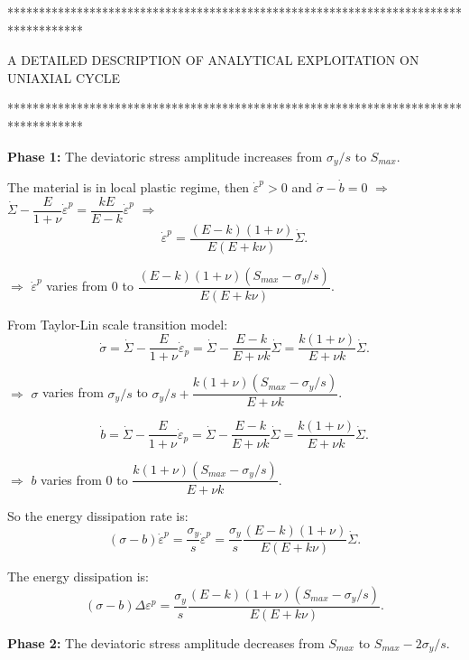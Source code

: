 ************************************************************************************

 A DETAILED DESCRIPTION OF ANALYTICAL EXPLOITATION ON UNIAXIAL CYCLE
 
\noindent              
************************************************************************************

\noindent
\textbf{Phase 1:} The deviatoric stress amplitude increases from $\sigma_y/s$ to $S_{max}$.

\noindent
The material is in local plastic regime, then $\dot{\varepsilon}^p>0$ and $\dot{\sigma}-\dot{b}=0$ $\Rightarrow$ $\dot{\Sigma}-\dfrac{E}{1+\nu}\dot{\varepsilon}^p=\dfrac{kE}{E-k}\dot{\varepsilon}^p$ $\Rightarrow$ 
$$\dot{\varepsilon}^p=\dfrac{(E- k)(1+\nu)}{E(E+k\nu)}\dot{\Sigma}.$$

\vspace{6pt}
\noindent
$\Rightarrow$ $\dot{\varepsilon}^p$ varies from 0 to $\dfrac{(E- k)(1+\nu)(S_{max}-\sigma_y/s)}{E(E+k\nu)}$.

\vspace{6pt}
\noindent
From Taylor-Lin scale transition model:
$$\dot{\sigma}=\dot{\Sigma}-\dfrac{E}{1+\nu}\dot{\varepsilon}_p=\dot{\Sigma}-\dfrac{E-k}{E+\nu k}\dot{\Sigma}=\dfrac{k(1+\nu)}{E+\nu k}\dot{\Sigma}.$$

\vspace{6pt}
\noindent
$\Rightarrow$ $\sigma$ varies from $\sigma_y/s$ to $\sigma_y/s+\dfrac{k(1+\nu)(S_{max}-\sigma_y/s)}{E+\nu k}$.

\vspace{6pt}
$$\dot{b}=\dot{\Sigma}-\dfrac{E}{1+\nu}\dot{\varepsilon}_p=\dot{\Sigma}-\dfrac{E-k}{E+\nu k}\dot{\Sigma}=\dfrac{k(1+\nu)}{E+\nu k}\dot{\Sigma}.$$

\vspace{6pt}
\noindent
$\Rightarrow$ $b$ varies from $0$ to $\dfrac{k(1+\nu)(S_{max}-\sigma_y/s)}{E+\nu k}$.

\vspace{6pt}
\noindent
So the energy dissipation rate is: $$(\sigma-b)\dot{\varepsilon}^p=\dfrac{\sigma_y}{s}\dot{\varepsilon}^p=\dfrac{\sigma_y}{s}\dfrac{(E- k)(1+\nu)}{E(E+k\nu)}\dot{\Sigma}.$$

\noindent
The energy dissipation is: $$(\sigma-b)\Delta\varepsilon^p=\dfrac{\sigma_y}{s}\dfrac{(E- k)(1+\nu)(S_{max}-\sigma_y/s)}{E(E+k\nu)}.$$

\vspace{6pt}
\noindent
\textbf{Phase 2:} The deviatoric stress amplitude decreases from $S_{max}$ to $S_{max}-2\sigma_y/s$.

